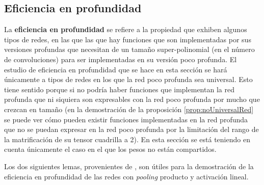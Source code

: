 \subsection{Eficiencia en profundidad}

La \textbf{eficiencia en profundidad} se refiere a la propiedad que exhiben algunos tipos de redes, en las que las que hay funciones que son implementadas por sus versiones profundas que necesitan de un tamaño super-polinomial (en el número de convoluciones) para ser implementadas en su versión poco profunda. El estudio de eficiencia en profundidad que se hace en esta sección se hará únicamente a tipos de redes en los que la red poco profunda sea universal. Esto tiene sentido porque si no podría haber funciones que implementan la red profunda que ni siquiera son expresables con la red poco profunda por mucho que crezcan en tamaño (en la demostración de la proposición \ref{prop:noUniversalRed} se puede ver cómo pueden existir funciones implementadas en la red profunda que no se puedan expresar en la red poco profunda por la limitación del rango de la matrificación de su tensor cuadrilla a 2). En esta sección se está teniendo en cuenta únicamente el caso en el que los pesos no están compartidos.

Los dos siguientes lemas, provenientes de \cite{DBLP:journals/corr/CohenSS15a}, son útiles para la demostración de la eficiencia en profundidad de las redes con \textit{pooling} producto y activación lineal.

